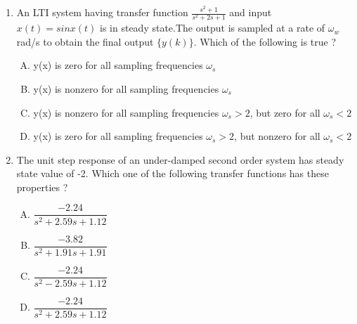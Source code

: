 \documentclass[journal,12pt,twocolumn]{IEEEtran}
\begin{document}
\begin{enumerate}[1.]
\begin{enumerate}[(A)]
\end{enumerate}

\item An LTI system having transfer function $\frac{s^{2}+1}{s^{2}+2s+1}$ and input $x(t)=sinx(t)$ is in steady state.The output is sampled at a rate of $\omega_w$ rad/s to obtain the final output $\{y(k)\}$. Which of the following is true ?\\

\begin{enumerate}[(A)]

\setlength\itemsep{1em}

\item y(x) is zero for all sampling frequencies $\omega_s$
\item y(x) is nonzero for all sampling frequencies $\omega_s$
\item y(x) is nonzero for all sampling frequencies $\omega_s>2$, but zero for all $\omega_s<2$
\item y(x) is zero for all sampling frequencies $\omega_s>2$, but nonzero for all $\omega_s<2$

\end{enumerate}

\item The unit step response of an under-damped second order system has steady state value of -2. Which one of the following transfer functions has these properties ?\\


\begin{enumerate}[(A)]

\setlength\itemsep{1em}

\item $\dfrac{-2.24}{s^{2}+2.59s+1.12}$
\item $\dfrac{-3.82}{s^{2}+1.91s+1.91}$
\item $\dfrac{-2.24}{s^{2}-2.59s+1.12}$
\item $\dfrac{-2.24}{s^{2}+2.59s+1.12}$


\end{enumerate}
\end{enumerate}
\end{document}
